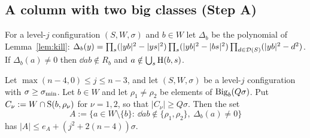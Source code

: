 \subsection{A column with two big classes (Step A)}

For a level-$j$ configuration $(S,W,\sigma)$ and $b\in W$ let $\Delta_b$ be the polynomial of
Lemma~\ref{lem:kill}:
$\Delta_b(y)=\prod_{s}(|yb|^2-|ys|^2)\prod_s(|yb|^2-|bs|^2)\prod_{d\in\mathcal{D}(S)}(|yb|^2-d^2)$. If
$\Delta_b(a)\ne0$ then $\dd ab\notin R_b$ and $a\notin\bigcup_s\mathrm{H}(b,s)$.

\begin{lemma}[Step A]\label{lem:stepA}
Let $\max(n-4,0)\le j\le n-3$, and let $(S,W,\sigma)$ be a level-$j$ configuration with $\sigma\ge\sigma_{\min}$. Let $b\in W$
and let $\rho_1\ne\rho_2$ be elements of $\mathrm{Big}_b(Q\sigma)$. Put $C_\nu:=W\cap\mathrm{S}(b,\rho_\nu)$ for $\nu=1,2$, so that
$|C_\nu|\ge Q\sigma$. Then the set
\[
A:=\{a\in W\setminus\{b\}:\ \dd ab\notin\{\rho_1,\rho_2\},\ \Delta_b(a)\ne0\}
\]
has $|A|\le e_A+(j^2+2(n-4))\sigma$.
\end{lemma}

